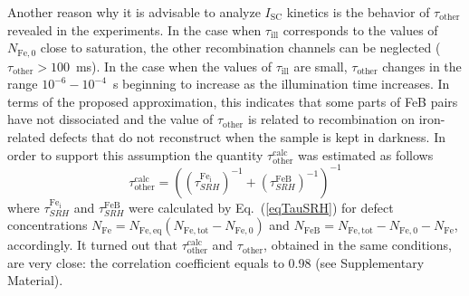 \documentclass[%
 aip,jap,
 amsmath,amssymb,
 reprint,%
]{revtex4-1}
\begin{document}
Another reason why it is advisable to analyze $I_\mathrm{SC}$ kinetics is the behavior of
$\tau_\mathrm{other}$ revealed in the experiments.
In the case when $\tau_\mathrm{ill}$ corresponds to the values of $N_\mathrm{Fe,0}$ close to saturation, the other recombination channels  can be neglected ($\tau_\mathrm{other}> 100$~ms).
In the case when the values of $\tau_\mathrm{ill}$ are small,
$\tau_\mathrm{other}$ changes in the range $10^{-6}-10^{-4}$~s beginning to increase as the illumination time increases.
In terms of the proposed approximation, this indicates that some parts of FeB pairs have not dissociated and the value of $\tau_\mathrm{other}$ is related
to recombination on iron-related defects that do not reconstruct when the sample is kept in darkness. In order to support this assumption the quantity
$\tau_\mathrm{other}^\mathrm{calc}$
was estimated as follows
\begin{equation*}
\tau_\mathrm{other}^\mathrm{calc}=\left(\left(\tau_{SRH}^\mathrm{Fe_i}\right)^{-1}
+\left(\tau_{SRH}^\mathrm{FeB}\right)^{-1}\right)^{-1}
\end{equation*}
where
$\tau_{SRH}^\mathrm{Fe_i}$ and $\tau_{SRH}^\mathrm{FeB}$
were calculated by Eq.~(\ref{eqTauSRH}) for defect concentrations
$N_\mathrm{Fe}=N_\mathrm{Fe,eq}(N_\mathrm{Fe,tot}-N_\mathrm{Fe,0})$
and $N_\mathrm{FeB}= N_\mathrm{Fe,tot}-N_\mathrm{Fe,0}- N_\mathrm{Fe}$, accordingly.
It turned out that $\tau_\mathrm{other}^\mathrm{calc}$ and
$\tau_\mathrm{other}$, obtained in the same conditions, are very close:
the correlation coefficient equals to 0.98 (see Supplementary Material).

\end{document}
